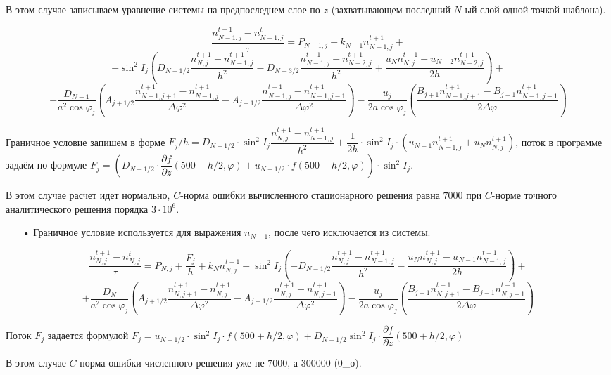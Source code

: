 \documentclass[2pt, a4paper, fleqn]{extarticle}
\begin{document}
В этом случае записываем уравнение системы на предпоследнем слое по $z$ (захватывающем последний $N$-ый слой одной точкой шаблона).

$$\dfrac{n_{N-1, j}^{t+1}-n_{N-1, j}^t}{\tau} = P_{N-1, j} + k_{N-1}n_{N-1, j}^{t+1} +$$ $$+ \sin^2 I_j \left( D_{N-1/2}\dfrac{n_{N, j}^{t+1} - n_{N-1, j}^{t+1}}{h^2} - D_{N-3/2}\dfrac{n_{N-1, j}^{t+1} - n_{N-2, j}^{t+1}}{h^2} + \dfrac{u_{N}n_{N, j}^{t+1} - u_{N-2}n_{N-2, j}^{t+1}}{2h} \right) + $$ $$+ \dfrac{D_{N-1}}{a^2\cos\varphi_j} \left(A_{j+1/2}\dfrac{n_{N-1, j+1}^{t+1}-n_{N-1, j}^{t+1}}{\Delta\varphi^2} - A_{j-1/2}\dfrac{n_{N-1, j}^{t+1}-n_{N-1, j-1}^{t+1}}{\Delta\varphi^2}\right) -\dfrac{u_j}{2a\cos\varphi_j} \left(\dfrac{B_{j+1} n_{N-1, j+1}^{t+1} - B_{j-1}n_{N-1, j-1}^{t+1}}{2\Delta\varphi} \right)$$

Граничное условие запишем в форме $F_j/h = D_{N-1/2} \cdot \sin^2 I_j\dfrac{n_{N, j}^{t+1} - n_{N-1, j}^{t+1}}{h^2} + \dfrac{1}{2h}\cdot \sin^2 I_j\cdot(u_{N-1}n_{N-1, j}^{t+1} + u_N n_{N, j}^{t+1})$, поток в программе задаём по формуле $F_j = \left(D_{N-1/2} \cdot \dfrac{\partial f}{\partial z}(500 - h/2, \varphi) + u_{N-1/2}\cdot f(500-h/2, \varphi)\right)\cdot \sin^2 I_j$.

В этом случае расчет идет нормально, $C$-норма ошибки вычисленного стационарного решения равна $7000$ при $C$-норме точного аналитического решения порядка $3\cdot 10^{6}$.

\begin{itemize}

\item[•] Граничное условие используется для выражения $n_{N+1}$, после чего исключается из системы.

\end{itemize}

$$\dfrac{n_{N, j}^{t+1}-n_{N, j}^t}{\tau} = P_{N, j} + \dfrac{F_j}{h} + k_{N}n_{N, j}^{t+1} + \sin^2 I_j \left(- D_{N-1/2}\dfrac{n_{N, j}^{t+1} - n_{N-1, j}^{t+1}}{h^2} - \dfrac{u_{N}n_{N, j}^{t+1} - u_{N-1}n_{N-1, j}^{t+1}}{2h} \right) + $$ $$+ \dfrac{D_N}{a^2\cos\varphi_j} \left(A_{j+1/2}\dfrac{n_{N, j+1}^{t+1}-n_{N, j}^{t+1}}{\Delta\varphi^2} - A_{j-1/2}\dfrac{n_{N, j}^{t+1}-n_{N, j-1}^{t+1}}{\Delta\varphi^2}\right) -\dfrac{u_j}{2a\cos\varphi_j} \left(\dfrac{B_{j+1} n_{N, j+1}^{t+1} - B_{j-1}n_{N, j-1}^{t+1}}{2\Delta\varphi} \right)$$

Поток $F_j$ задается формулой $F_j = u_{N+1/2}\cdot\sin^2 I_j \cdot f(500+h/2, \varphi) + D_{N+1/2}\sin^2 I_j\cdot \dfrac{\partial f}{\partial z}(500 + h/2, \varphi)$

В этом случае $C$-норма ошибки численного решения уже не $7000$, а $300 000$ (0{\_}о).

\bigskip
\end{document}
